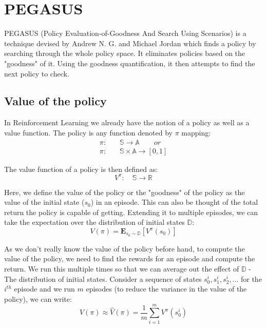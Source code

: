 \documentclass[hidelinks,BTech]{iitmdiss}
\begin{document}

\chapter{PEGASUS}

PEGASUS \cite{PEGASUS} (Policy Evaluation-of-Goodness And Search Using Scenarios) is a technique devised by Andrew N. G. and Michael Jordan which finds a policy by searching through the whole policy space. It eliminates policies based on the "goodness" of it. Using the goodness quantification, it then attempts to find the next policy to check.

\section{Value of the policy}

In Reinforcement Learning we already have the notion of a policy as well as a value function. The policy is any function denoted by $\pi$ mapping:
\begin{equation} \begin{split}
  \pi :& \quad \mathbb{S} \rightarrow \mathbb{A} \qquad or \\
  \pi :& \quad \mathbb{S} \times \mathbb{A} \rightarrow [0,1]
\end{split} \end{equation}

The value function of a policy is then defined as:
\begin{equation}
  V^{\pi} : \quad \mathbb{S} \rightarrow \mathbb{R}
\end{equation}

Here, we define the value of the policy or the "goodness" of the policy as the value of the initial state ($s_{0}$) in an episode. This can also be thought of the total return the policy is capable of getting. Extending it to multiple episodes, we can take the expectation over the distribution of initial states $\mathbb{D}$:
\begin{equation}
  V(\pi) = \mathbf{E}_{s_{0} \sim \mathbb{D}} [ V^{\pi} (s_{0})]
\end{equation}

As we don't really know the value of the policy before hand, to compute the value of the policy, we need to find the rewards for an episode and compute the return. We run this multiple times so that we can average out the effect of $\mathbb{D}$ - The distribution of initial states. Consider a sequence of states ${s_{0}^{i}, s_{1}^{i}, s_{2}^{i}, ...}$ for the $i^{th}$ episode and we run $m$ episodes (to reduce the variance in the value of the policy), we can write:
\begin{equation}
  V(\pi) \approx \hat{V}(\pi) = \frac{1}{m} \sum_{i=1}^{m} V^{\pi} (s_{0}^{i})
\end{equation}
\end{document}

